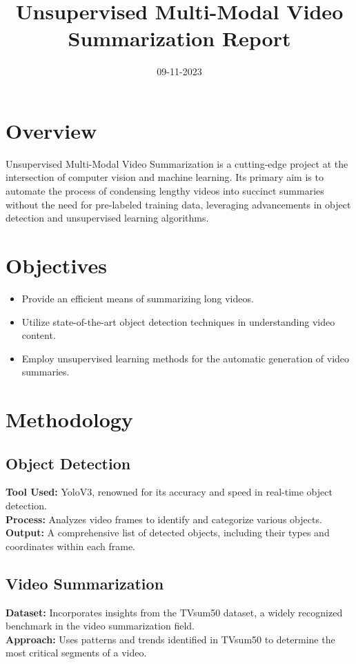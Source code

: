 \documentclass[conference]{IEEEtran}
\title{\Huge Unsupervised Multi-Modal Video Summarization Report}
\author{\IEEEauthorblockN{Papagrigoriou Vasileios Savvas}
\IEEEauthorblockA{Auth}}
\date{09-11-2023}
\begin{document}
\maketitle

\section*{Overview}
Unsupervised Multi-Modal Video Summarization is a cutting-edge project at the intersection of computer vision and machine learning. Its primary aim is to automate the process of condensing lengthy videos into succinct summaries without the need for pre-labeled training data, leveraging advancements in object detection and unsupervised learning algorithms.

\section*{Objectives}
\begin{itemize}
    \item Provide an efficient means of summarizing long videos.
    \item Utilize state-of-the-art object detection techniques in understanding video content.
    \item Employ unsupervised learning methods for the automatic generation of video summaries.
\end{itemize}

\section*{Methodology}
\subsection*{Object Detection}
\textbf{Tool Used:} YoloV3, renowned for its accuracy and speed in real-time object detection.\\
\textbf{Process:} Analyzes video frames to identify and categorize various objects.\\
\textbf{Output:} A comprehensive list of detected objects, including their types and coordinates within each frame.

\subsection*{Video Summarization}
\textbf{Dataset:} Incorporates insights from the TVsum50 dataset, a widely recognized benchmark in the video summarization field.\\
\textbf{Approach:} Uses patterns and trends identified in TVsum50 to determine the most critical segments of a video.
\end{document}
